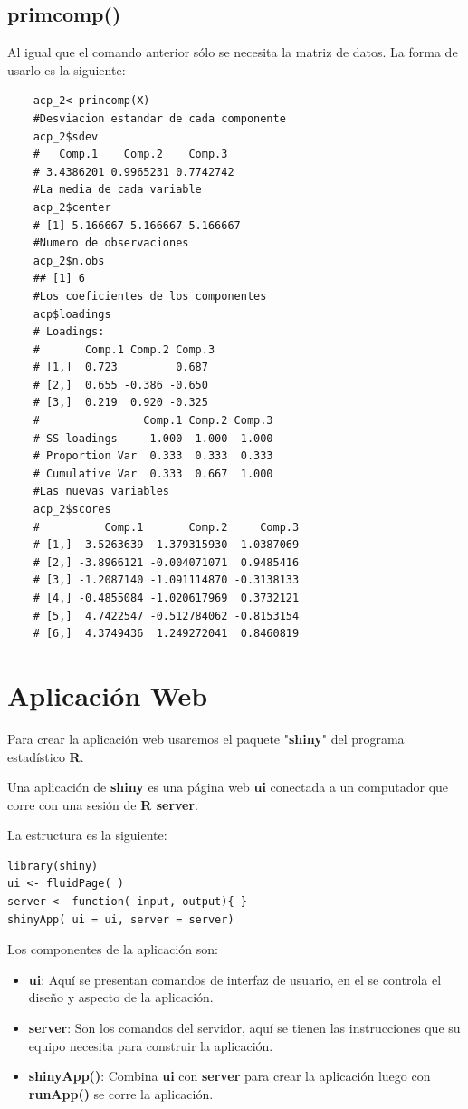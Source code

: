 \documentclass[12pt,letterpaper]{report} %
\begin{document}
\subsection{primcomp()}

Al igual que el comando anterior sólo se necesita la matriz de datos. La forma de usarlo es la siguiente:

	\begin{lstlisting}
	acp_2<-princomp(X)
	#Desviacion estandar de cada componente
	acp_2$sdev
	#   Comp.1    Comp.2    Comp.3 
	# 3.4386201 0.9965231 0.7742742 
	#La media de cada variable
	acp_2$center
	# [1] 5.166667 5.166667 5.166667
	#Numero de observaciones
	acp_2$n.obs
	## [1] 6
	#Los coeficientes de los componentes
	acp$loadings
	# Loadings:
	#       Comp.1 Comp.2 Comp.3
	# [1,]  0.723         0.687
	# [2,]  0.655 -0.386 -0.650
	# [3,]  0.219  0.920 -0.325
	#                Comp.1 Comp.2 Comp.3
	# SS loadings     1.000  1.000  1.000
	# Proportion Var  0.333  0.333  0.333
	# Cumulative Var  0.333  0.667  1.000
	#Las nuevas variables
	acp_2$scores
	#          Comp.1       Comp.2     Comp.3
	# [1,] -3.5263639  1.379315930 -1.0387069
	# [2,] -3.8966121 -0.004071071  0.9485416
	# [3,] -1.2087140 -1.091114870 -0.3138133
	# [4,] -0.4855084 -1.020617969  0.3732121
	# [5,]  4.7422547 -0.512784062 -0.8153154
	# [6,]  4.3749436  1.249272041  0.8460819
	\end{lstlisting}

\section{Aplicación Web}

Para crear la aplicación web usaremos el paquete "\textbf{shiny}" del programa estadístico \textbf{R}. 

Una aplicación de \textbf{shiny} es una página web \textbf{ui} conectada a un computador que corre con una sesión de \textbf{R server}. 

La estructura es la siguiente: 

\begin{lstlisting}
library(shiny) 
ui <- fluidPage( ) 
server <- function( input, output){ } 
shinyApp( ui = ui, server = server) 
\end{lstlisting}

Los componentes de la aplicación son: 
\begin{itemize}
	\item \textbf{ui}: Aquí se presentan comandos de interfaz de usuario, en el se controla el diseño y aspecto de la aplicación. 
	\item \textbf{server}: Son los comandos del servidor, aquí se tienen las instrucciones que su equipo necesita para construir la aplicación.
	\item \textbf{shinyApp()}: Combina \textbf{ui} con \textbf{server} para crear la aplicación luego con \textbf{runApp()} se corre la aplicación. 
\end{itemize}
\end{document}
